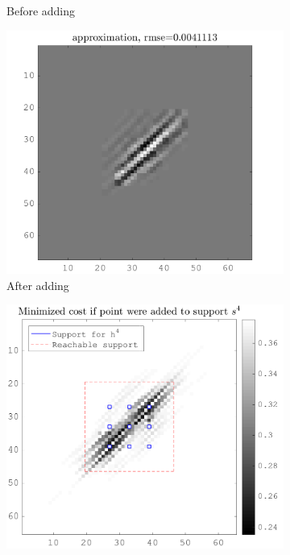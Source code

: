 \begin{figure}[!ht]
\begin{subfigure}[b]{0.32\textwidth}
\caption{Before adding}
\end{subfigure}
\begin{subfigure}[b]{0.32\textwidth}\centering
\includegraphics[width=\textwidth]{figures/before_after/xp_128x128_sc2_angl1_K3_S3_node4after_approx.png}
\caption{After adding}
\end{subfigure}
\begin{subfigure}[b]{0.32\textwidth}\centering
\includegraphics[width=\textwidth]{figures/before_after/xp_128x128_sc2_angl1_K3_S3_node4before_objmatrix.png}

\end{subfigure}
\end{figure}

